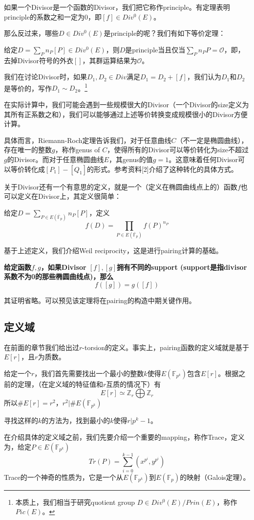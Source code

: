 \documentclass[12pt]{article}
\newcommand{\ec}{椭圆曲线}
\newcommand{\oo}{\mathcal{O}}
\newcommand{\fp}{\mathbb{F}_p}
\newcommand{\fpk}{\mathbb{F}_{p^k}}
\newcommand{\bfp}{\bar{\mathbb{F}}_p}
\begin{document}
如果一个Divisor是一个函数的Divisor，我们把它称作principle。有定理表明principle的系数之和一定为0，即$[f] \in Div^0(E)$。

那么反过来，哪些$D \in  Div^0(E)$是principle的呢？我们有如下等价定理：

给定$D = \sum_P n_P[P] \in Div^0(E)$，则$D$是principle当且仅当$\sum_P n_P P = \oo$，即，去掉Divisor符号的外衣$[]$，其群运算结果为$\oo$。

我们在讨论Divisor时，如果$D_1,D_2 \in Div$满足$D_1=D_2+[f]$，我们认为$D_1$和$D_2$是等价的，写作$D_1 \sim D_2$。\footnote{本质上，我们相当于研究quotient group $D \in Div^0(E)/Prin(E)$，称作$Pic(E)$。}

在实际计算中，我们可能会遇到一些规模很大的Divisor（一个Divisor的size定义为其所有正系数之和），我们可以能够通过上述等价转换变成规模很小的Divisor方便计算。

具体而言，Riemann-Roch定理告诉我们，对于任意曲线$C$（不一定是椭圆曲线），存在唯一的整数$g$，称作genus of $C$，使得所有的Divisor可以等价转化为size不超过$g$的Divisor。而对于任意椭圆曲线$E$，其genus的值$g=1$。这意味着任何Divisor可以等价转化成$[P_1]-[Q_1]$的形式。参考资料[2]介绍了这种转化的具体方式。

关于Divisor还有一个有意思的定义，就是一个（定义在\ec 点上的）函数$f$也可以定义在Divisor上，其定义很简单：

给定$D=\sum_{P \in E(\bfp)} n_P[P]$，定义
$$ f(D) = \prod_{P \in E(\bfp)} f(P)^{n_P}$$

基于上述定义，我们介绍Weil reciprocity，这是进行pairing计算的基础。

\textbf{给定函数$f,g$，如果Divisor $[f],[g]$拥有不同的support (support是指divisor系数不为0的那些\ec 点)，那么
$$ f([g])=g([f])$$}

其证明省略。可以预见该定理将在pairing的构造中期关键作用。
\subsection{定义域}
在前面的章节我们给出过$r$-torsion的定义。事实上，pairing函数的定义域就是基于$E[r]$，且$r$为质数。

给定一个$r$，我们首先需要找出一个最小的整数$k$使得$E(\fpk)$包含$E[r]$。根据之前的定理，（在定义域的特征值和$r$互质的情况下）有
$$E[r] \simeq \mathbb{Z}_r \bigoplus \mathbb{Z}_r $$
所以$\# E[r]=r^2$，$r^2 | \# E(\fpk)$

寻找这样的$k$的方法为，找到最小的$k$使得$r|p^k-1$。

在介绍具体的定义域之前，我们先要介绍一个重要的mapping，称作Trace，定义为，给定$P \in E(\fpk)$
$$ Tr(P) = \sum_{i=0}^{k-1} (x^{p^i},y^{p^i})$$
Trace的一个神奇的性质为，它是一个从$E(\fpk)$到$E(\fp)$的映射（Galois定理）。
\end{document}
